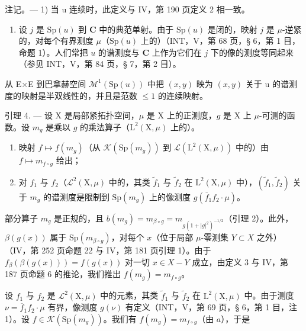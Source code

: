 注记。--- 1) 当 u 连续时，此定义与 IV，第 190 页定义 2 相一致。

\begin{enumerate}
\def\labelenumi{\arabic{enumi})}
\setcounter{enumi}{1}
\tightlist
\item
  设 \(j\) 是 \(\mathrm{Sp}(u)\) 到 \(\mathbf{C}\) 中的典范单射。由于 \(\mathrm{Sp}(u)\) 是闭的，映射 \(j\) 是 \(\mu\)-逆紧的，对每个有界测度 \(\mu\)（\(\mathrm{Sp}(u)\) 上的）（INT，V，第 68 页，§ 6，第 1 目，命题 1）。人们常把 \(u\) 的谱测度与 \(\mathbf{C}\) 上作为它们在 \(j\) 下的像的测度等同起来（参见 INT，V，第 84 页，§ 7，第 2 目）。
\end{enumerate}

从 E×E 到巴拿赫空间 \(\mathcal{M}^{1}(\mathrm{Sp}(u))\) 中把 \((x,y)\) 映为 \((x,y)\) 关于 u 的谱测度的映射是半双线性的，并且是范数 \(\leqslant 1\) 的连续映射。

引理 4. --- 设 X 是局部紧拓扑空间，\(\mu\) 是 X 上的正测度，\(g\) 是 X 上 \(\mu\)-可测的函数。设 \(m_g\) 是乘以 \(g\) 的乘法算子（\(\mathrm{L}^2 (\mathrm{X},\mu)\) 上的）。

\begin{enumerate}
\def\labelenumi{\alph{enumi})}
\item
  映射 \(f\mapsto f(m_{g})\)（从 \(\mathcal{K}(\mathrm{Sp}(m_g))\) 到 \(\mathcal{L}(\mathrm{L}^{2}(\mathrm{X},\mu))\) 中的）由 \(f\mapsto m_{f\circ g}\) 给出；
\item
  对 \(f_1\) 与 \(f_2\)（\(\mathcal{L}^2(\mathrm{X},\mu)\) 中的，其类 \(\widetilde{f}_1\) 与 \(\widetilde{f}_2\) 在 \(\mathrm{L}^2(\mathrm{X},\mu)\) 中），\((\widetilde{f}_1,\widetilde{f}_2)\) 关于 \(m_g\) 的谱测度是限制到 \(\mathrm{Sp}(m_g)\) 上的像测度 \(g(\overline{f}_1f_2\cdot \mu)\)。
\end{enumerate}

部分算子 \(m_g\) 是正规的，且 \(b(m_g) = m_{\beta \circ g} = m_{g(1+|g|^2)^{-1/2}}\)（引理 2）。此外，\(\beta(g(x))\) 属于 \(\mathrm{Sp}(m_{\beta \circ g})\)，对每个 \(x\)（位于局部 \(\mu\)-零测集 \(Y \subset X\) 之外）（IV，第 252 页命题 22 与 IV，第 181 页引理 1）。由于 \(f_\beta(\beta(g(x))) = f(g(x))\) 对一切 \(x \in X - Y\) 成立，由定义 3 与 IV，第 187 页命题 6 的推论，我们推出 \(f(m_g) = m_{f \circ g}\)。

设 \(f_1\) 与 \(f_2\) 是 \(\mathcal{L}^2(\mathrm{X},\mu)\) 中的元素，其类 \(\widetilde{f}_1\) 与 \(\widetilde{f}_2\) 在 \(\mathrm{L}^2(\mathrm{X},\mu)\) 中。由于测度 \(\nu = \overline{f}_1f_2\cdot \mu\) 有界，像测度 \(g(\nu)\) 有定义（INT，V，第 69 页，§ 6，第 1 目，注 1）。设 \(f\in \mathcal{K}(\mathrm{Sp}(m_g))\)。我们有 \(f(m_{g}) = m_{f\circ g}\)（由 \(a\)），于是

